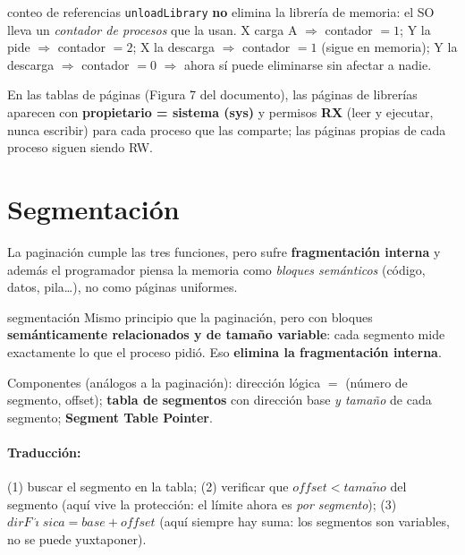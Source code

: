 \documentclass[11pt,letterpaper]{article}
\begin{document}
\begin{defin}{conteo de referencias}
\texttt{unloadLibrary} \textbf{no} elimina la librer\'ia de memoria: el SO lleva un \emph{contador de procesos} que la usan. X carga A $\Rightarrow$ contador $=1$; Y la pide $\Rightarrow$ contador $=2$; X la descarga $\Rightarrow$ contador $=1$ (sigue en memoria); Y la descarga $\Rightarrow$ contador $=0$ $\Rightarrow$ ahora s\'i puede eliminarse sin afectar a nadie.
\end{defin}

En las tablas de p\'aginas (Figura 7 del documento), las p\'aginas de librer\'ias aparecen con \textbf{propietario = sistema (sys)} y permisos \textbf{RX} (leer y ejecutar, nunca escribir) para cada proceso que las comparte; las p\'aginas propias de cada proceso siguen siendo RW.

\section{Segmentaci\'on}

La paginaci\'on cumple las tres funciones, pero sufre \textbf{fragmentaci\'on interna} y adem\'as el programador piensa la memoria como \emph{bloques sem\'anticos} (c\'odigo, datos, pila\dots), no como p\'aginas uniformes.

\begin{defin}{segmentaci\'on}
Mismo principio que la paginaci\'on, pero con bloques \textbf{sem\'anticamente relacionados y de tama\~no variable}: cada segmento mide exactamente lo que el proceso pidi\'o. Eso \textbf{elimina la fragmentaci\'on interna}.
\end{defin}

Componentes (an\'alogos a la paginaci\'on): direcci\'on l\'ogica $=$ (n\'umero de segmento, offset); \textbf{tabla de segmentos} con direcci\'on base \emph{y tama\~no} de cada segmento; \textbf{Segment Table Pointer}.

\paragraph{Traducci\'on:} (1) buscar el segmento en la tabla; (2) verificar que $\mathit{offset} < \mathit{tama\tilde{n}o}$ del segmento (aqu\'i vive la protecci\'on: el l\'imite ahora es \emph{por segmento}); (3) $\mathit{dirF\acute{\imath}sica} = \mathit{base} + \mathit{offset}$ (aqu\'i siempre hay suma: los segmentos son variables, no se puede yuxtaponer).
\end{document}
